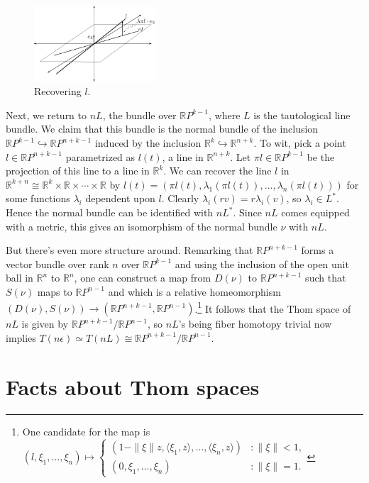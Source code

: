 \documentclass{article}
\newcommand{\R}{\mathbb{R}}
\newcommand{\RP}{\R P}
\newcommand{\into}{\hookrightarrow}
\begin{document}
\begin{figure}
\centering\includegraphics[width=0.4\textwidth]{figures/fig8.pdf}
\caption{\small Recovering $l$.}
\end{figure} %
Next, we return to $nL$, the bundle over $\RP^{k-1}$, where $L$ is the tautological line bundle.  We claim that this bundle is the normal bundle of the inclusion $\RP^{k-1} \into \RP^{n+k-1}$ induced by the inclusion $\R^k \into \R^{n+k}$.  To wit, pick a point $l \in \RP^{n+k-1}$ parametrized as $l(t)$, a line in $\R^{n+k}$.  Let $\pi l \in \RP^{k-1}$ be the projection of this line to a line in $\R^k$.  We can recover the line $l$ in $\R^{k+n} \cong \R^k \times \R \times \cdots \times \R$ by $l(t) = (\pi l(t), \lambda_1(\pi l(t)), \ldots, \lambda_n(\pi l(t)))$ for some functions $\lambda_i$ dependent upon $l$.  Clearly $\lambda_i(rv) = r \lambda_i(v)$, so $\lambda_i \in L^*$.  Hence the normal bundle can be identified with $nL^*$.  Since $nL$ comes equipped with a metric, this gives an isomorphism of the normal bundle $\nu$ with $nL$.

But there's even more structure around.  Remarking that $\RP^{n+k-1}$ forms a vector bundle over rank $n$ over $\RP^{k-1}$ and using the inclusion of the open unit ball in $\R^n$ to $\R^n$, one can construct a map from $D(\nu)$ to $\RP^{n+k-1}$ such that $S(\nu)$ maps to $\RP^{n-1}$ and which is a relative homeomorphism $(D(\nu), S(\nu)) \to (\RP^{n+k-1}, \RP^{n-1})$.\footnote{One candidate for the map is $(l, \xi_1, \ldots, \xi_n) \mapsto \begin{cases}(1 - \|\xi\|z, \langle \xi_1, z\rangle, \ldots, \langle \xi_n, z\rangle) & : \| \xi \| < 1, \\ (0, \xi_1, \ldots, \xi_n) & : \|\xi\| = 1. \end{cases}$}  It follows that the Thom space of $nL$ is given by $\RP^{n+k-1}/\RP^{n-1}$, so $nL$'s being fiber homotopy trivial now implies $T(n\epsilon) \simeq T(nL) \cong \RP^{n+k-1}/\RP^{n-1}$.


\section{Facts about Thom spaces} %
\end{document}
